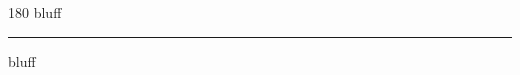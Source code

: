 
\begin{frame}
\begin{center}
\begin{turn}{180}
{\fontsize{2.5cm}{1em}\selectfont bluff}
\end{turn}
\vspace{1em}\par  
\hrule
\vspace{1em}\par  
{\fontsize{2.5cm}{1em}\selectfont bluff}
\end{center}
\end{frame}

